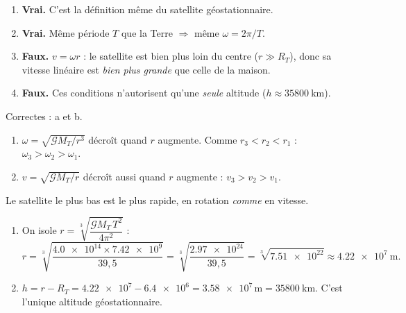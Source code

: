 \documentclass[11pt,a4paper]{article}
\begin{document}

\begin{corrige}
\begin{enumerate}[label=\alph*)]
  \item \textbf{Vrai.} C'est la définition même du satellite géostationnaire.
  \item \textbf{Vrai.} Même période $T$ que la Terre $\Rightarrow$ même
        $\omega=2\pi/T$.
  \item \textbf{Faux.} $v=\omega r$ : le satellite est bien plus loin du centre
        ($r\gg R_T$), donc sa vitesse linéaire est \emph{bien plus grande} que celle
        de la maison.
  \item \textbf{Faux.} Ces conditions n'autorisent qu'une \emph{seule} altitude
        ($h\approx\qty{35800}{\kilo\metre}$).
\end{enumerate}
Correctes : a et b.
\end{corrige}

\begin{corrige}
\begin{enumerate}[label=\alph*)]
  \item $\omega=\sqrt{\mathcal{G}M_T/r^3}$ décroît quand $r$ augmente. Comme
        $r_3<r_2<r_1$ : $\boxed{\omega_3>\omega_2>\omega_1}$.
  \item $v=\sqrt{\mathcal{G}M_T/r}$ décroît aussi quand $r$ augmente :
        $\boxed{v_3>v_2>v_1}$.
\end{enumerate}
Le satellite le plus bas est le plus rapide, en rotation \emph{comme} en vitesse.
\end{corrige}

\begin{corrige}
\begin{enumerate}[label=\alph*)]
  \item On isole $r=\sqrt[3]{\dfrac{\mathcal{G}M_T\,T^2}{4\pi^2}}$ :
        \[
        r=\sqrt[3]{\frac{\num{4.0e14}\times\num{7.42e9}}{39{,}5}}
         =\sqrt[3]{\frac{\num{2.97e24}}{39{,}5}}
         =\sqrt[3]{\num{7.51e22}}\approx\qty{4.22e7}{\metre}.
        \]
  \item $h=r-R_T=\num{4.22e7}-\num{6.4e6}=\num{3.58e7}\,\si{\metre}
        =\qty{35800}{\kilo\metre}$. C'est l'unique altitude géostationnaire.
\end{enumerate}
\end{corrige}
\end{document}
